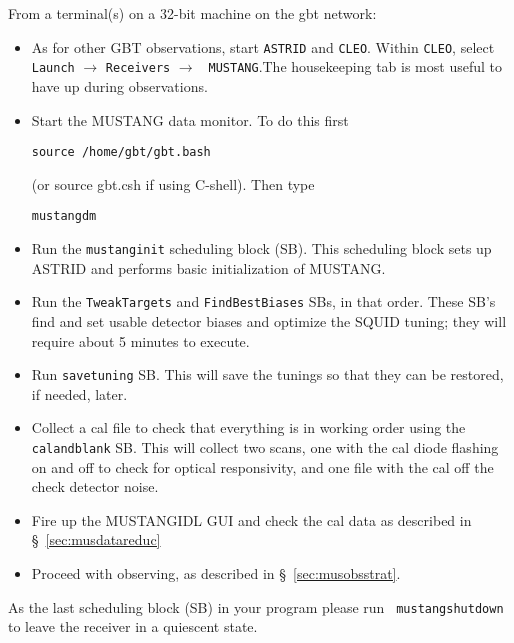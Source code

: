 From a terminal(s) on a 32-bit machine on the gbt network:
\begin{itemize}

\item As for other GBT observations, start {\tt ASTRID} and {\tt CLEO}. Within {\tt CLEO},
select {\tt Launch} $\rightarrow$ {\tt Receivers} $\rightarrow$ {\tt
MUSTANG}.The housekeeping tab is most useful to have up during
observations.

\item Start the MUSTANG data monitor. To do this first

\noindent
{\tt source /home/gbt/gbt.bash}

\noindent
(or source gbt.csh if using C-shell). Then type

\noindent
{\tt mustangdm}

\item Run the {\tt mustanginit} scheduling block (SB). This scheduling block sets up ASTRID and
performs basic initialization of MUSTANG.

\item Run the {\tt TweakTargets} and {\tt FindBestBiases} SBs, in that order. These
SB's find and set usable detector biases and optimize the SQUID
tuning; they will require about 5 minutes to execute.

\item Run {\tt savetuning} SB. This will save the tunings so that they can be
restored, if needed, later.


\item Collect a cal file to check that everything is in working order using
the {\tt calandblank} SB.  This will collect two scans, one with the
cal diode flashing on and off to check for optical responsivity, and
one file with the cal off the check detector noise.

\item Fire up the MUSTANGIDL GUI and check the cal data as described in \S~\ref{sec:musdatareduc}

\item Proceed with observing, as described in \S~\ref{sec:musobsstrat}.

\end{itemize}

As the last scheduling block (SB) in your program please run {\tt
mustangshutdown} to leave the receiver in a quiescent state.


